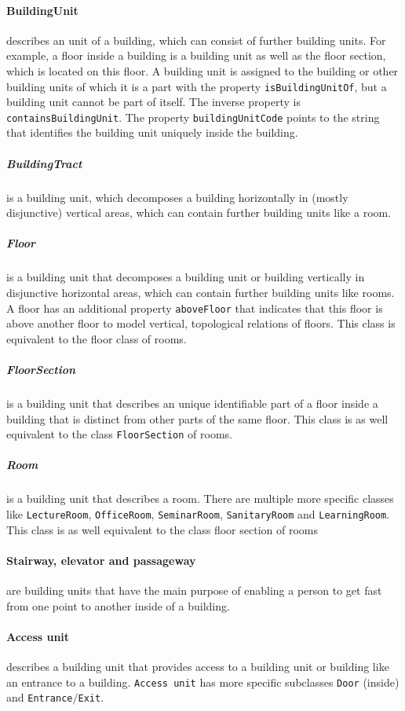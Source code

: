 \documentclass[draft,final]{vutinfth} %
\begin{document}
\paragraph{BuildingUnit} describes an unit of a building, which can consist of further building units. For example, a floor inside a building is a building unit as well as the floor section, which is located on this floor. A building unit is assigned to the building or other building units of which it is a part with the property \texttt{isBuildingUnitOf}, but a building unit cannot be part of itself. The inverse property is \texttt{containsBuildingUnit}. The property \texttt{buildingUnitCode} points to the string that identifies the building unit uniquely inside the building.

\subparagraph{BuildingTract} is a building unit, which decomposes a building horizontally in (mostly disjunctive) vertical areas, which can contain further building units like a room.

\subparagraph{Floor} is a building unit that decomposes a building unit or building vertically in disjunctive horizontal areas, which can contain further building units like rooms. A floor has an additional property \texttt{aboveFloor} that indicates that this floor is above another floor to model vertical, topological relations of floors. This class is equivalent to the floor class of \gls{rooms}. 

\subparagraph{FloorSection} is a building unit that describes an unique identifiable part of a floor inside a building that is distinct from other parts of the same floor. This class is as well equivalent to the class \texttt{FloorSection} of \gls{rooms}.

\subparagraph{Room} is a building unit that describes a room. There are multiple more specific classes like \texttt{LectureRoom}, \texttt{OfficeRoom}, \texttt{SeminarRoom}, \texttt{SanitaryRoom} and \texttt{LearningRoom}. This class is as well equivalent to the class floor section of \gls{rooms}

\paragraph{Stairway, elevator and passageway} are building units that have the main purpose of enabling a person to get fast from one point to another inside of a building.

\paragraph{Access unit} describes a building unit that provides access to a building unit or building like an entrance to a building. \texttt{Access unit} has more specific subclasses \texttt{Door} (inside) and \texttt{Entrance}$/$\texttt{Exit}.
\end{document}
